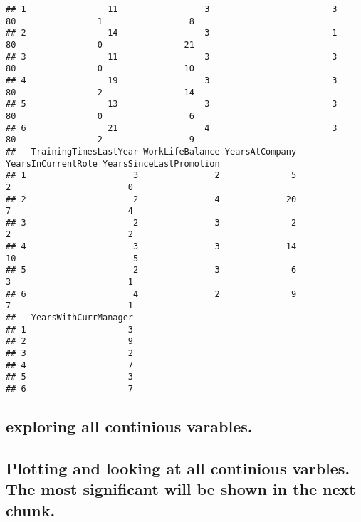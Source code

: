 \documentclass[
]{article}
\begin{document}
\begin{verbatim}
## 1                11                 3                        3            80                1                 8
## 2                14                 3                        1            80                0                21
## 3                11                 3                        3            80                0                10
## 4                19                 3                        3            80                2                14
## 5                13                 3                        3            80                0                 6
## 6                21                 4                        3            80                2                 9
##   TrainingTimesLastYear WorkLifeBalance YearsAtCompany YearsInCurrentRole YearsSinceLastPromotion
## 1                     3               2              5                  2                       0
## 2                     2               4             20                  7                       4
## 3                     2               3              2                  2                       2
## 4                     3               3             14                 10                       5
## 5                     2               3              6                  3                       1
## 6                     4               2              9                  7                       1
##   YearsWithCurrManager
## 1                    3
## 2                    9
## 3                    2
## 4                    7
## 5                    3
## 6                    7
\end{verbatim}

\hypertarget{exploring-all-continious-varables.}{%
\subsection{exploring all continious
varables.}\label{exploring-all-continious-varables.}}

\hypertarget{plotting-and-looking-at-all-continious-varbles.-the-most-significant-will-be-shown-in-the-next-chunk.}{%
\subsection{Plotting and looking at all continious varbles. The most
significant will be shown in the next
chunk.}\label{plotting-and-looking-at-all-continious-varbles.-the-most-significant-will-be-shown-in-the-next-chunk.}}
\end{document}
